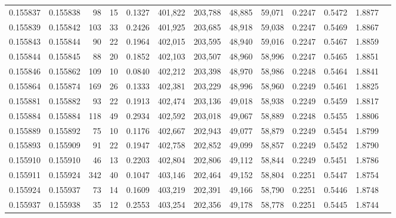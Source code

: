 \begin{tabular}{rrrrrrrrrrrrr}
0.155837 & 0.155838 &    98 &  15 &                                     0.1327 & 401,822 & 203,788 &  48,885 &  59,071 & 0.2247 & 0.5472 & 1.8877 \\
0.155839 & 0.155842 &   103 &  33 &                                     0.2426 & 401,925 & 203,685 &  48,918 &  59,038 & 0.2247 & 0.5469 & 1.8867 \\
0.155843 & 0.155844 &    90 &  22 &                                     0.1964 & 402,015 & 203,595 &  48,940 &  59,016 & 0.2247 & 0.5467 & 1.8859 \\
0.155844 & 0.155845 &    88 &  20 &                                     0.1852 & 402,103 & 203,507 &  48,960 &  58,996 & 0.2247 & 0.5465 & 1.8851 \\
0.155846 & 0.155862 &   109 &  10 &                                     0.0840 & 402,212 & 203,398 &  48,970 &  58,986 & 0.2248 & 0.5464 & 1.8841 \\
0.155864 & 0.155874 &   169 &  26 &                                     0.1333 & 402,381 & 203,229 &  48,996 &  58,960 & 0.2249 & 0.5461 & 1.8825 \\
0.155881 & 0.155882 &    93 &  22 &                                     0.1913 & 402,474 & 203,136 &  49,018 &  58,938 & 0.2249 & 0.5459 & 1.8817 \\
0.155884 & 0.155884 &   118 &  49 &                                     0.2934 & 402,592 & 203,018 &  49,067 &  58,889 & 0.2248 & 0.5455 & 1.8806 \\
0.155889 & 0.155892 &    75 &  10 &                                     0.1176 & 402,667 & 202,943 &  49,077 &  58,879 & 0.2249 & 0.5454 & 1.8799 \\
0.155893 & 0.155909 &    91 &  22 &                                     0.1947 & 402,758 & 202,852 &  49,099 &  58,857 & 0.2249 & 0.5452 & 1.8790 \\
0.155910 & 0.155910 &    46 &  13 &                                     0.2203 & 402,804 & 202,806 &  49,112 &  58,844 & 0.2249 & 0.5451 & 1.8786 \\
0.155911 & 0.155924 &   342 &  40 &                                     0.1047 & 403,146 & 202,464 &  49,152 &  58,804 & 0.2251 & 0.5447 & 1.8754 \\
0.155924 & 0.155937 &    73 &  14 &                                     0.1609 & 403,219 & 202,391 &  49,166 &  58,790 & 0.2251 & 0.5446 & 1.8748 \\
0.155937 & 0.155938 &    35 &  12 &                                     0.2553 & 403,254 & 202,356 &  49,178 &  58,778 & 0.2251 & 0.5445 & 1.8744 \\

\end{tabular}
